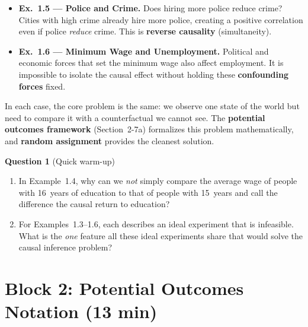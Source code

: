 \documentclass[11pt,a4paper]{article}
\begin{document}
\begin{bookexample}
\begin{itemize}[leftmargin=1.5em,itemsep=3pt]
  \item \textbf{Ex.~1.5 --- Police and Crime.} Does hiring more police reduce crime? Cities with high crime already hire more police, creating a positive correlation even if police \emph{reduce} crime. This is \textbf{reverse causality} (simultaneity).

  \item \textbf{Ex.~1.6 --- Minimum Wage and Unemployment.} Political and economic forces that set the minimum wage also affect employment. It is impossible to isolate the causal effect without holding these \textbf{confounding forces} fixed.
\end{itemize}

\smallskip
In each case, the core problem is the same: we observe one state of the world but need to compare it with a counterfactual we cannot see. The \textbf{potential outcomes framework} (Section~2-7a) formalizes this problem mathematically, and \textbf{random assignment} provides the cleanest solution.
\end{bookexample}

\textbf{Question 1} (Quick warm-up)

\begin{enumerate}[label=(\alph*)]
\item In Example~1.4, why can we \emph{not} simply compare the average wage of people with 16~years of education to that of people with 15~years and call the difference the causal return to education?

\begin{answerbox}
\vspace{3cm}
\end{answerbox}

\item For Examples~1.3--1.6, each describes an ideal experiment that is infeasible. What is the \emph{one} feature all these ideal experiments share that would solve the causal inference problem?

\begin{answerbox}
\vspace{3cm}
\end{answerbox}
\end{enumerate}

\newpage
\section{Block 2: Potential Outcomes Notation \textnormal{(13 min)}}
\end{document}
